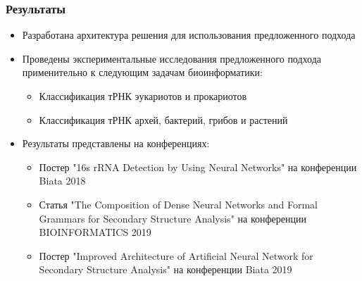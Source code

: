 \documentclass{beamer}
\begin{document}
\begin{frame}\frametitle{Результаты}
\begin{itemize}
    \item Разработана архитектура решения для использования предложенного подхода
    \item Проведены экспериментальные исследования предложенного подхода применительно к следующим задачам биоинформатики:
    \begin{itemize}
        \item Классификация тРНК эукариотов и прокариотов
        \item Классификация тРНК архей, бактерий, грибов и растений
    \end{itemize}
    \item Результаты представлены на конференциях:
    \begin{itemize}
        \item Постер "16s rRNA Detection by Using Neural Networks" на конференции Biata 2018
        \item Статья "The Composition of Dense Neural Networks and Formal Grammars for Secondary Structure Analysis" на конференции BIOINFORMATICS 2019
        \item Постер  "Improved Architecture of Artificial Neural Network for Secondary Structure Analysis" на конференции Biata 2019
    \end{itemize}

\end{itemize}
\end{frame}
\end{document}
